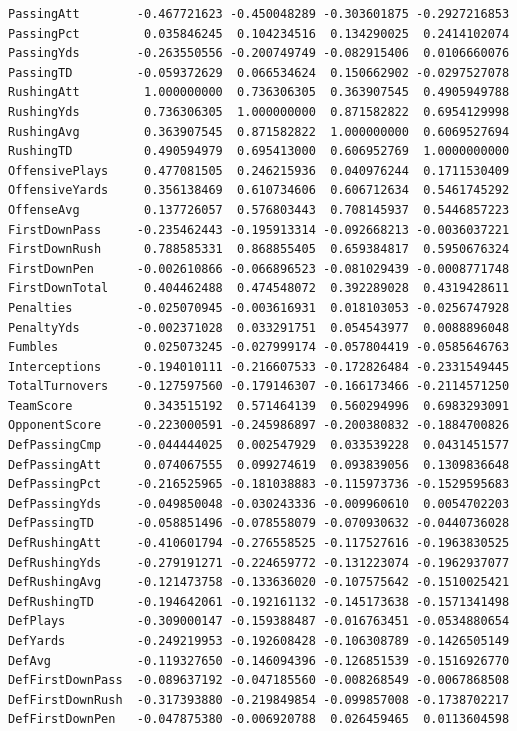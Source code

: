 \documentclass[
  letterpaper,
  DIV=11,
  numbers=noendperiod]{scrreprt}
\begin{document}
\begin{verbatim}
PassingAtt        -0.467721623 -0.450048289 -0.303601875 -0.2927216853
PassingPct         0.035846245  0.104234516  0.134290025  0.2414102074
PassingYds        -0.263550556 -0.200749749 -0.082915406  0.0106660076
PassingTD         -0.059372629  0.066534624  0.150662902 -0.0297527078
RushingAtt         1.000000000  0.736306305  0.363907545  0.4905949788
RushingYds         0.736306305  1.000000000  0.871582822  0.6954129998
RushingAvg         0.363907545  0.871582822  1.000000000  0.6069527694
RushingTD          0.490594979  0.695413000  0.606952769  1.0000000000
OffensivePlays     0.477081505  0.246215936  0.040976244  0.1711530409
OffensiveYards     0.356138469  0.610734606  0.606712634  0.5461745292
OffenseAvg         0.137726057  0.576803443  0.708145937  0.5446857223
FirstDownPass     -0.235462443 -0.195913314 -0.092668213 -0.0036037221
FirstDownRush      0.788585331  0.868855405  0.659384817  0.5950676324
FirstDownPen      -0.002610866 -0.066896523 -0.081029439 -0.0008771748
FirstDownTotal     0.404462488  0.474548072  0.392289028  0.4319428611
Penalties         -0.025070945 -0.003616931  0.018103053 -0.0256747928
PenaltyYds        -0.002371028  0.033291751  0.054543977  0.0088896048
Fumbles            0.025073245 -0.027999174 -0.057804419 -0.0585646763
Interceptions     -0.194010111 -0.216607533 -0.172826484 -0.2331549445
TotalTurnovers    -0.127597560 -0.179146307 -0.166173466 -0.2114571250
TeamScore          0.343515192  0.571464139  0.560294996  0.6983293091
OpponentScore     -0.223000591 -0.245986897 -0.200380832 -0.1884700826
DefPassingCmp     -0.044444025  0.002547929  0.033539228  0.0431451577
DefPassingAtt      0.074067555  0.099274619  0.093839056  0.1309836648
DefPassingPct     -0.216525965 -0.181038883 -0.115973736 -0.1529595683
DefPassingYds     -0.049850048 -0.030243336 -0.009960610  0.0054702203
DefPassingTD      -0.058851496 -0.078558079 -0.070930632 -0.0440736028
DefRushingAtt     -0.410601794 -0.276558525 -0.117527616 -0.1963830525
DefRushingYds     -0.279191271 -0.224659772 -0.131223074 -0.1962937077
DefRushingAvg     -0.121473758 -0.133636020 -0.107575642 -0.1510025421
DefRushingTD      -0.194642061 -0.192161132 -0.145173638 -0.1571341498
DefPlays          -0.309000147 -0.159388487 -0.016763451 -0.0534880654
DefYards          -0.249219953 -0.192608428 -0.106308789 -0.1426505149
DefAvg            -0.119327650 -0.146094396 -0.126851539 -0.1516926770
DefFirstDownPass  -0.089637192 -0.047185560 -0.008268549 -0.0067868508
DefFirstDownRush  -0.317393880 -0.219849854 -0.099857008 -0.1738702217
DefFirstDownPen   -0.047875380 -0.006920788  0.026459465  0.0113604598

\end{verbatim}
\end{document}
